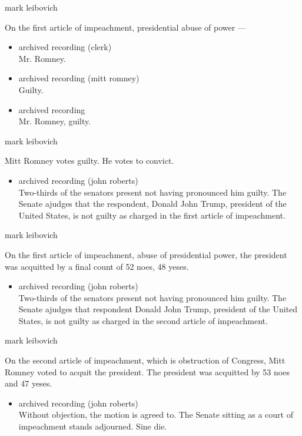 mark leibovich

On the first article of impeachment, presidential abuse of power ---

\begin{itemize}
\item
  archived recording (clerk)\\
  Mr. Romney.
\item
  archived recording (mitt romney)\\
  Guilty.
\item
  archived recording\\
  Mr. Romney, guilty.
\end{itemize}

mark leibovich

Mitt Romney votes guilty. He votes to convict.

\begin{itemize}
\tightlist
\item
  archived recording (john roberts)\\
  Two-thirds of the senators present not having pronounced him guilty.
  The Senate ajudges that the respondent, Donald John Trump, president
  of the United States, is not guilty as charged in the first article of
  impeachment.
\end{itemize}

mark leibovich

On the first article of impeachment, abuse of presidential power, the
president was acquitted by a final count of 52 noes, 48 yeses.

\begin{itemize}
\tightlist
\item
  archived recording (john roberts)\\
  Two-thirds of the senators present not having pronounced him guilty.
  The Senate ajudges that respondent Donald John Trump, president of the
  United States, is not guilty as charged in the second article of
  impeachment.
\end{itemize}

mark leibovich

On the second article of impeachment, which is obstruction of Congress,
Mitt Romney voted to acquit the president. The president was acquitted
by 53 noes and 47 yeses.

\begin{itemize}
\tightlist
\item
  archived recording (john roberts)\\
  Without objection, the motion is agreed to. The Senate sitting as a
  court of impeachment stands adjourned. Sine die.
\end{itemize}


